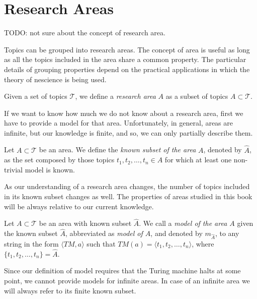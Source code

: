 %
%

\section{Research Areas}
\label{sec:areas}

{\color{red} TODO: not sure about the concept of research area.}

Topics can be grouped into research areas. The concept of area is useful as long as all the topics included in the area share a common property. The particular details of grouping properties depend on the practical applications in which the theory of nescience is being used.

\begin{definition}
Given a set of topics $\mathcal{T}$, we define a \emph{research area} $A$ as a subset of topics $A \subset \mathcal{T}$.
\end{definition}

If we want to know how much we do not know about a research area, first we have to provide a model for that area. Unfortunately, in general, areas are infinite, but our knowledge is finite, and so, we can only partially describe them.

\begin{definition}
Let $A \subset \mathcal{T}$ be an area. We define the \emph{known subset of the area} $A$, denoted by $\hat{A}$, as the set composed by those topics $t_1, t_2, \ldots, t_n \in A$ for which at least one non-trivial model is known.
\end{definition}

As our understanding of a research area changes, the number of topics included in its known subset changes as well. The properties of areas studied in this book will be always relative to our current knowledge.

\begin{definition}
Let $A \subset \mathcal{T}$ be an area with known subset $\hat{A}$. We call a \emph{model of the area $A$} given the known subset $\hat{A}$, abbreviated as \emph{model of $A$}, and denoted by $m_{\hat{A}}$, to any string in the form $\langle TM, a\rangle$ such that $TM(a) = \langle t_1, t_2, \ldots, t_n\rangle$, where $\{t_1, t_2, \ldots, t_n\} = \hat{A}$.
\end{definition}

Since our definition of model requires that the Turing machine halts at some point, we cannot provide models for infinite areas. In case of an infinite area we will always refer to its finite known subset.

